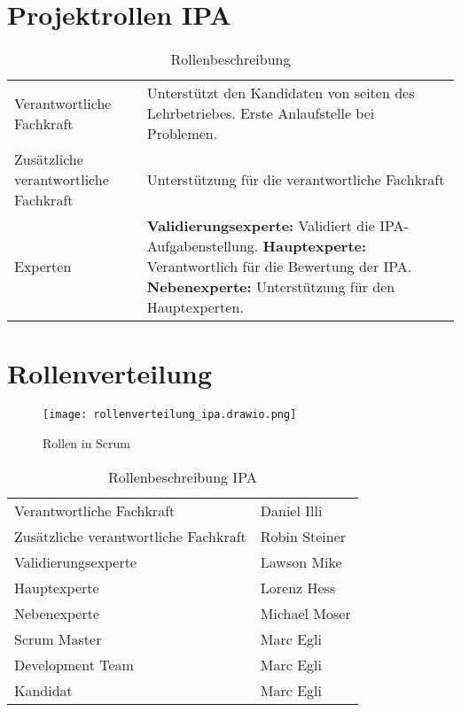 \section{Projektrollen IPA}
\begin{table}[h!]
    \begin{tabular}{|L{0.4\textwidth}|L{0.5\textwidth}|}
        \hline
          \\[12pt]
        \hline
        Verantwortliche Fachkraft & Unterstützt den Kandidaten von seiten des Lehrbetriebes. Erste Anlaufstelle bei Problemen.  \\
        \hline
        Zusätzliche verantwortliche Fachkraft & Unterstützung für die verantwortliche Fachkraft \\
        \hline
        Experten & \textbf{Validierungsexperte:} Validiert die IPA-Aufgabenstellung.
                    \textbf{Hauptexperte:} Verantwortlich für die Bewertung der IPA.
                    \textbf{Nebenexperte:} Unterstützung für den Hauptexperten. \\ 
        \hline
      \end{tabular}
      \caption{Rollenbeschreibung}
\end{table}

\newpage

\section{Rollenverteilung}
\begin{figure}[h]
    \centering
    \texttt{[image: rollenverteilung\_ipa.drawio.png]}
    \caption{Rollen in Scrum}
\end{figure}

\begin{table}[h!]
    \begin{tabular}{|L{0.4\textwidth}|L{0.5\textwidth}|}
        \hline
          \\[12pt]
        \hline
        Verantwortliche Fachkraft & Daniel Illi  \\
        \hline
        Zusätzliche verantwortliche Fachkraft & Robin Steiner \\
        \hline
        Validierungsexperte & Lawson Mike \\ 
        \hline
        Hauptexperte & Lorenz Hess \\ 
        \hline
        Nebenexperte & Michael Moser \\ 
        \hline
        Scrum Master & Marc Egli \\ 
        \hline
        Development Team & Marc Egli \\ 
        \hline
        Kandidat & Marc Egli \\ 
        \hline
      \end{tabular}
      \caption{Rollenbeschreibung IPA}
\end{table}


